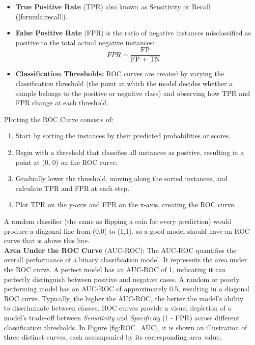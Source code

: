\begin{itemize}
  \item \textbf{True Positive Rate} (TPR) also known as Sensitivity or Recall (\ref{formula:recall}).
  \item \textbf{False Positive Rate} (FPR) is the ratio of negative instances misclassified as positive to the total actual negative instances:
  \begin{equation}
    \textit{FPR} = \frac{\text{FP}}{\text{FP + TN}}
    \label{formula:falsePositiveRate}
  \end{equation}

  \item \textbf{Classification Thresholds:} ROC curves are created by varying the classification threshold (the point at which the model decides whether a sample belongs to the positive or negative class) and observing how TPR and FPR change at each threshold.
\end{itemize}
Plotting the ROC Curve consists of:
\begin{enumerate}
  \item Start by sorting the instances by their predicted probabilities or scores.
  \item Begin with a threshold that classifies all instances as positive, resulting in a point at (0, 0) on the ROC curve.
  \item Gradually lower the threshold, moving along the sorted instances, and calculate TPR and FPR at each step.
  \item Plot TPR on the y-axis and FPR on the x-axis, creating the ROC curve.
\end{enumerate}
A random classifier (the same as flipping a coin for every prediction) would produce a diagonal line from (0,0) to (1,1), so a good model should have an ROC curve that is above this line.\\

\textbf{Area Under the ROC Curve} (AUC-ROC):
The AUC-ROC quantifies the overall performance of a binary classification model. It represents the area under the ROC curve.
A perfect model has an AUC-ROC of 1, indicating it can perfectly distinguish between positive and negative cases.
A random or poorly performing model has an AUC-ROC of approximately 0.5, resulting in a diagonal ROC curve.
Typically, the higher the AUC-ROC, the better the model's ability to discriminate between classes.
ROC curves provide a visual depiction of a model's trade-off between \textit{Sensitivity} and \textit{Specificity} (1 - FPR) across different classification thresholds.
In Figure \ref{fig:ROC_AUC}, it is shown an illustration of three distinct curves, each accompanied by its corresponding area value.\\

